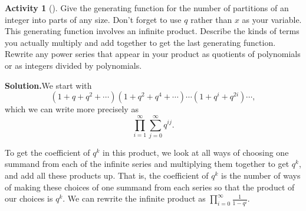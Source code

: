 \documentclass[10pt,]{book}
\theoremstyle{plain}
\theoremstyle{definition}
\newtheorem{activity}[project]{Activity}
\numberwithin{equation}{chapter}
\begin{document}
\begin{activity}[]\label{genfunpartitions}
Give the generating function for the number of partitions of an integer into parts of any size. Don't forget to use \(q\) rather than \(x\) as your variable.  This generating function involves an infinite product. Describe the kinds of terms you actually multiply and add together to get the last generating function. Rewrite any power series that appear in your product as quotients of polynomials or as integers divided by polynomials.%
\par\medskip\noindent%
\textbf{Solution.}\quad We start with%
\begin{equation*}
(1+q+q^2+\cdots)(1+q^2+q^4+\cdots)\cdots(1+q^i+q^{2i})\cdots,
\end{equation*}
which we can write more precisely as%
\begin{equation*}
\prod_{i=1}^\infty \sum_{j=0}^\infty q^{ij}.
\end{equation*}
%
\par
To get the coefficient of \(q^k\) in this product, we look at all ways of choosing one summand from each of the infinite series and multiplying them together to get \(q^k\), and add all these products up. That is, the coefficient of \(q^k\) is the number of ways of making these choices of one summand from each series so that the product of our choices is \(q^k\). We can rewrite the infinite product as \(\displaystyle\prod_{i=0}^\infty\frac{1}{1-q^i}\).%
\end{activity}
\end{document}
